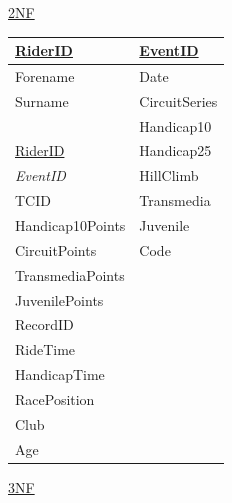 \underline{2NF}

\begin{tabular}{|l|l|}
\hline
\underline{RiderID} & \underline{EventID} \\ \hline
Forename            & Date                \\ \hline
Surname             & CircuitSeries       \\ \hline
                    & Handicap10          \\ \hline
\underline{RiderID} & Handicap25          \\ \hline
\emph{EventID}      & HillClimb           \\ \hline 
TCID                & Transmedia          \\ \hline 
Handicap10Points    & Juvenile            \\ \hline
CircuitPoints       & Code                \\ \hline 
TransmediaPoints    &                     \\ \hline
JuvenilePoints      &                     \\ \hline
RecordID            &                     \\ \hline
RideTime            &                     \\ \hline
HandicapTime        &                     \\ \hline
RacePosition        &                     \\ \hline
Club                &                     \\ \hline
Age                 &                     \\ \hline

\end{tabular}

\underline{3NF}

